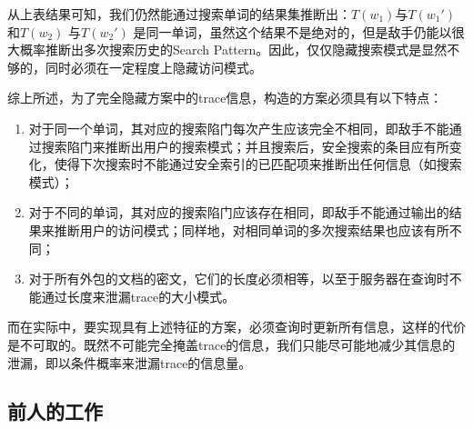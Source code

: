 从上表结果可知，我们仍然能通过搜索单词的结果集推断出：$T(w_1)$与$T(w_1')$和$T(w_2)$ 与$T(w_2')$ 是同一单词，虽然这个结果不是绝对的，但是敌手仍能以很大概率推断出多次搜索历史的Search Pattern。因此，仅仅隐藏搜索模式是显然不够的，同时必须在一定程度上隐藏访问模式。


综上所述，为了完全隐藏方案中的trace信息，构造的方案必须具有以下特点：
\begin{enumerate}
  \item
  对于同一个单词，其对应的搜索陷门每次产生应该完全不相同，即敌手不能通过搜索陷门来推断出用户的搜索模式；并且搜索后，安全搜索的条目应有所变化，使得下次搜索时不能通过安全索引的已匹配项来推断出任何信息（如搜索模式）；

  \item
  对于不同的单词，其对应的搜索陷门应该存在相同，即敌手不能通过输出的结果来推断用户的访问模式；同样地，对相同单词的多次搜索结果也应该有所不同；

  \item
  对于所有外包的文档的密文，它们的长度必须相等，以至于服务器在查询时不能通过长度来泄漏trace的大小模式。
\end{enumerate}

而在实际中，要实现具有上述特征的方案，必须查询时更新所有信息，这样的代价是不可取的。既然不可能完全掩盖trace的信息，我们只能尽可能地减少其信息的泄漏，即以条件概率来泄漏trace的信息量。


\subsection{前人的工作}
\label{sec:searchpattern_scheme_related_work}

